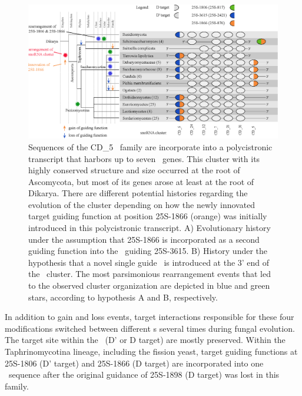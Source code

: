 \begin{figure}
  \centering
  \includegraphics[width=\textwidth]{pics/target_switches_CD_5_cluster.eps}
  \caption[Evolution of a \sno\ cluster harboring CD\_5
  sequences.]{Sequences of the CD\_5 \sno\ family are incorporate into
    a polycistronic transcript that harbors up to seven \sno\
    genes. This cluster with its highly conserved structure and size
    occurred at the root of Ascomycota, but most of its genes arose at
    least at the root of Dikarya. There are different potential
    histories regarding the evolution of the cluster depending on how
    the newly innovated target guiding function at position 25S-1866
    (orange) was initially introduced in this polycistronic
    transcript. A) Evolutionary history under the assumption that
    25S-1866 is incorporated as a second guiding function into the
    \sno\ guiding 25S-3615. B) History under the hypothesis that a
    novel single guide \sno\ is introduced at the 3' end of the \sno\
    cluster. The most parsimonious rearrangement events that led to
    the observed cluster organization are depicted in blue and green
    stars, according to hypothesis A and B, respectively.}
\label{fig:CD_5_cluster_history}
\end{figure}

In addition to gain and loss events, target interactions responsible
for these four modifications switched between different \sno s several
times during fungal evolution. The target site within the \sno\ (D' or
D target) are mostly preserved. Within the Taphrinomycotina lineage,
including the fission yeast, target guiding functions at 25S-1806 (D'
target) and 25S-1866 (D target) are incorporated into one \sno\
sequence after the original guidance of 25S-1898 (D target) was lost
in this family.

